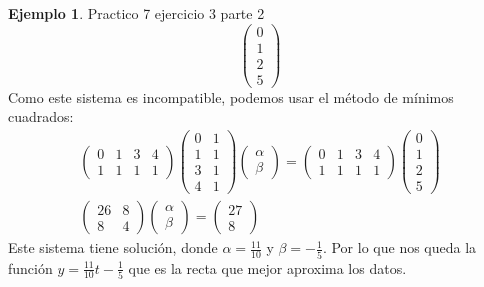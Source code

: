 \documentclass[10pt]{article}
\theoremstyle{definition}
\newtheorem{example}{Ejemplo}[section]
\begin{document}
\begin{example}{Practico 7 ejercicio 3 parte 2}
$$\begin{pmatrix}
			0 \\
			1 \\
			2 \\
			5
		\end{pmatrix}$$
	Como este sistema es incompatible, podemos usar el método de mínimos cuadrados:
	$$ \begin{array}{l}
			\begin{pmatrix}
				0 & 1 & 3 & 4 \\
				1 & 1 & 1 & 1
			\end{pmatrix}\begin{pmatrix}
				             0 & 1 \\
				             1 & 1 \\
				             3 & 1 \\
				             4 & 1
			             \end{pmatrix}\begin{pmatrix}
				                          \alpha \\
				                          \beta
			                          \end{pmatrix} =\begin{pmatrix}
				                                         0 & 1 & 3 & 4 \\
				                                         1 & 1 & 1 & 1
			                                         \end{pmatrix}\begin{pmatrix}
				                                                      0 \\
				                                                      1 \\
				                                                      2 \\
				                                                      5
			                                                      \end{pmatrix} \\
			\begin{pmatrix}
				26 & 8 \\
				8  & 4
			\end{pmatrix}\begin{pmatrix}
				             \alpha \\
				             \beta
			             \end{pmatrix} =\begin{pmatrix}
				                            27 \\
				                            8
			                            \end{pmatrix}
		\end{array}$$
	Este sistema tiene solución, donde $\alpha=\frac{11}{10}$ y $\beta=-\frac{1}{5}$. Por lo que nos queda la función $y=\frac{11}{10}t-\frac{1}{5}$ que es la recta que mejor aproxima los datos.
\end{example}\newpage
\end{document}
